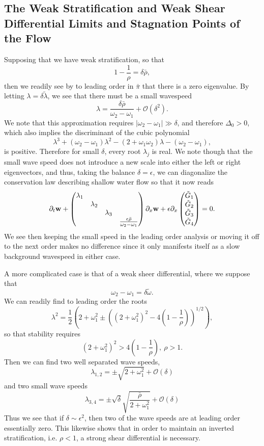 \documentclass[a4paper,11pt]{article}
\newcommand{\bp}{\begin{pmatrix}}
\newcommand{\ep}{\end{pmatrix}}
\newcommand{\p}{\partial}
\begin{document}
\subsection{The Weak Stratification and Weak Shear Differential Limits and Stagnation Points of the Flow}
Supposing that we have weak stratification, so that 
\[
1 - \frac{1}{\rho} = \delta \bar{\rho}, 
\]
 then we readily see by to leading order in $\bar{\pi}$ that there is a zero eigenvalue.  By letting $\lambda = \delta \tilde{\lambda}$, we see that there must be a small wavespeed 
\[
\lambda = \frac{\delta \bar{\rho}}{\omega_{2}-\omega_{1}} + \mathcal{O}(\delta^{2}).
\]
We note that this approximation requires $|\omega_{2}-\omega_{1}|\gg \delta$, and therefore $\Delta_{0}>0$, which also implies the discriminant of the cubic polynomial
\[
\lambda^{3} + (\omega_{2}-\omega_{1})\lambda^{2} - (2+\omega_{1}\omega_{2})\lambda - (\omega_{2}-\omega_{1}),
\]
is positive.  Therefore for small $\delta$, every root $\lambda_{j}$ is real.  We note though that the small wave speed does not introduce a new scale into either the left or right eigenvectors, and thus, taking the balance $\delta = \epsilon$, we can diagonalize the conservation law describing shallow water flow so that it now reads 
\[
\p_{t}{\bf w} +\bp \lambda_{1} & & & \\ & \lambda_{2} & & \\ & & \lambda_{3} & \\ & & & \frac{\epsilon \bar{\rho}}{\omega_{2}-\omega_{1}} \ep\p_{x}{\bf w} +  \epsilon\p_{x}\bp \tilde{G}_{1} \\ \tilde{G}_{2} \\ \tilde{G}_{3} \\ \tilde{G}_{4} \ep = 0.
\]
We see then keeping the small speed in the leading order analysis or moving it off to the next order makes no difference since it only manifests itself as a slow background wavespeed in either case.  

A more complicated case is that of a weak sheer differential, where we suppose that 
\[
\omega_{2}-\omega_{1} = \delta \tilde{\omega}.
\]
We can readily find to leading order the roots 
\[
\lambda^{2} = \frac{1}{2}\left(2+\omega_{1}^{2}\pm \left((2+\omega_{1}^{2})^{2}-4\left(1-\frac{1}{\rho} \right) \right)^{1/2} \right), 
\]
so that stability requires 
\[
(2+\omega_{1}^{2})^{2}>4\left(1-\frac{1}{\rho} \right), ~ \rho > 1.
\]
Then we can find two well separated wave speeds, 
\[
\lambda_{1,2} = \pm \sqrt{2 + \omega_{1}^{2}} + \mathcal{O}(\delta)
\]
and two small wave speeds
\[
\lambda_{3,4} = \pm \sqrt{\delta}\sqrt{\frac{\bar{\rho}}{2+\omega_{1}^{2}}} + \mathcal{O}(\delta)
\]
Thus we see that if $\delta \sim \epsilon^{2}$, then two of the wave speeds are at leading order essentially zero.  This likewise shows that in order to maintain an inverted stratification, i.e. $\rho<1$, a strong shear differential is necessary.  
\end{document}
